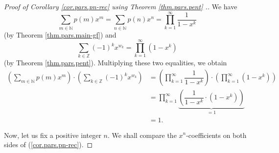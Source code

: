\begin{proof}
[Proof of Corollary \ref{cor.pars.pn-rec} using Theorem \ref{thm.pars.pent}%
.]We have%
\[
\sum_{m\in\mathbb{N}}p\left(  m\right)  x^{m}=\sum_{n\in\mathbb{N}}p\left(
n\right)  x^{n}=\prod\limits_{k=1}^{\infty}\dfrac{1}{1-x^{k}}%
\]
(by Theorem \ref{thm.pars.main-gf}) and%
\[
\sum_{k\in\mathbb{Z}}\left(  -1\right)  ^{k}x^{w_{k}}=\prod\limits_{k=1}%
^{\infty}\left(  1-x^{k}\right)
\]
(by Theorem \ref{thm.pars.pent}). Multiplying these two equalities, we obtain%
\begin{align}
\left(  \sum_{m\in\mathbb{N}}p\left(  m\right)  x^{m}\right)  \cdot\left(
\sum_{k\in\mathbb{Z}}\left(  -1\right)  ^{k}x^{w_{k}}\right)   &  =\left(
\prod\limits_{k=1}^{\infty}\dfrac{1}{1-x^{k}}\right)  \cdot\left(
\prod\limits_{k=1}^{\infty}\left(  1-x^{k}\right)  \right) \nonumber\\
&  =\prod\limits_{k=1}^{\infty}\underbrace{\left(  \dfrac{1}{1-x^{k}}%
\cdot\left(  1-x^{k}\right)  \right)  }_{=1}\nonumber\\
&  =1. \label{pf.cor.pars.pn-rec.1}%
\end{align}


Now, let us fix a positive integer $n$. We shall compare the $x^{n}%
$-coefficients on both sides of (\ref{cor.pars.pn-rec}).


\end{proof}
